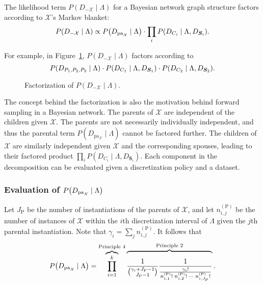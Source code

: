 \documentclass[twoside,11pt]{article}
\newcommand{\paren}[1]{\mathopen{}\mathclose\bgroup\left(#1\aftergroup\egroup\right)}
\DeclareMathOperator{\Pa}{pa} %
\newcommand{\cX}{\mathcal{X}} %
\begin{document}
The likelihood term ${P(D_{-\cX} \mid \Lambda)}$ for a Bayesian network graph structure factors according to $\cX$'s Markov blanket:
\begin{equation}
  \label{eq:p_D_given_M}
  P\paren{D_{-\cX} \mid \Lambda} \propto P\paren{D_{\Pa_\cX} \mid \Lambda} \cdot \prod_{i} P\paren{D_{C_i} \mid \Lambda, D_{\bm{S}_i}}\text{.}
\end{equation}

For example, in Figure~\ref{fig:example_factorization}, $P(D_{-\cX} \mid \Lambda)$ factors according to
\begin{equation}
  P\paren{D_{P_1,P_2,P_3} \mid \Lambda} \cdot P\paren{ D_{ C_1 } \mid \Lambda, D_{\bm{S}_1} } \cdot P\paren{D_{C_2} \mid \Lambda, D_{\bm{S}_2}}\text{.}
\end{equation}

\begin{figure}[ht]
  \centering
  
  \caption{Factorization of $P(D_{-\cX} \mid \Lambda)$.}
  \label{fig:example_factorization}
\end{figure}

The concept behind the factorization is also the motivation behind forward sampling in a Bayesian network.
The parents of $\cX$ are independent of the children given $\cX$.
The parents are not necessarily individually independent, and thus the parental term $P(D_{\Pa_{\cX}} \mid \Lambda)$ cannot be factored further.
The children of $\cX$ are similarly independent given $\cX$ and the corresponding spouses, leading to their factored product $\prod_{i} P(D_{C_i} \mid \Lambda, D_{\bm{S}_i})$.
Each component in the decomposition can be evaluated given a discretization policy and a dataset.

\subsubsection{Evaluation of $P\paren{D_{\Pa_{\cX}} \mid \Lambda}$}

Let $J_\text{P}$ be the number of instantiations of the parents of $\cX$, and let $n^{(\text{P})}_{i,j}$ be the number of instances of $\cX$ within the $i$th discretization interval of $\Lambda$ given the $j$th parental instantiation.
Note that $\gamma_i = \sum_j n^{(\text{P})}_{i,j}$.
It follows that
\begin{equation}
  \label{eq:likelihood_one}
  P\paren{D_{\Pa_{\cX}} \mid \Lambda} = \overbrace{\prod_{i=1}^k}^{\text{Principle 4}}
    \overbrace{\rule{0pt}{2em}
      \frac{1}{{{\gamma_i + J_\text{P} - 1}\choose{J_\text{P} - 1}}}
      \frac{1}{
        \frac{
          {\gamma_i}!
        }{
          {n^{(\text{P})}_{i,1}}! \; {n^{(\text{P})}_{i,2}}! \; \cdots \; {n^{(\text{P})}_{i,J_\text{P}}}!
        }
      }
    }^{\text{Principle 2}}\text{.}
\end{equation}
\end{document}
